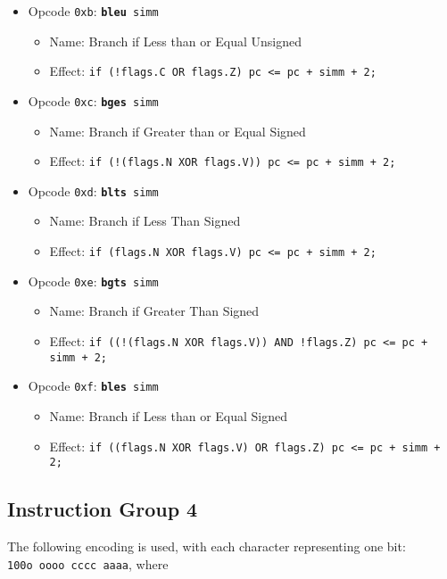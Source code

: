 \documentclass{article}
\begin{document}
\begin{itemize}
		\item Opcode \texttt{0xb}:
			\texttt{\textbf{bleu} simm}
		\begin{itemize}
			\item Name: Branch if Less than or Equal Unsigned
			\item Effect:
				\texttt{if (!flags.C OR flags.Z) pc <= pc + simm + 2;}
		\end{itemize}

		\item Opcode \texttt{0xc}:
			\texttt{\textbf{bges} simm}
		\begin{itemize}
			\item Name: Branch if Greater than or Equal Signed
			\item Effect:
				\texttt{if (!(flags.N XOR flags.V)) pc <= pc + simm + 2;}
		\end{itemize}

		\item Opcode \texttt{0xd}:
			\texttt{\textbf{blts} simm}
		\begin{itemize}
			\item Name: Branch if Less Than Signed
			\item Effect:
				\texttt{if (flags.N XOR flags.V) pc <= pc + simm + 2;}
		\end{itemize}

		\item Opcode \texttt{0xe}:
			\texttt{\textbf{bgts} simm}
		\begin{itemize}
			\item Name: Branch if Greater Than Signed
			\item Effect:
				\texttt{if ((!(flags.N XOR flags.V)) AND !flags.Z)
					pc <= pc + simm + 2;}
		\end{itemize}

		\item Opcode \texttt{0xf}:
			\texttt{\textbf{bles} simm}
		\begin{itemize}
			\item Name: Branch if Less than or Equal Signed
			\item Effect:
				\texttt{if ((flags.N XOR flags.V) OR flags.Z)
					pc <= pc + simm + 2;}
		\end{itemize}
	\end{itemize}

	\doublespacing
	\subsection{Instruction Group 4}
	The following encoding is used, with each character representing one
	bit: \\
	\texttt{100o oooo cccc aaaa}, where
\end{document}
